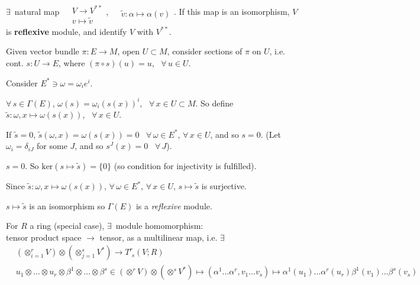 $\exists \,$ natural map $\begin{aligned} & \quad \\ 
	& V\to V^{**} \\ 
& v \mapsto \widetilde{v} \end{aligned}$,  $\begin{aligned} & \quad \\ 
	& \widetilde{v} : \alpha \mapsto \alpha(v) \end{aligned}$.  If this map is an isomorphism, $V$ is \textbf{reflexive} module, and identify $V$ with $V^{**}$.  

 Given vector bundle $\pi: E \to M$, open $U\subset M$, consider sections of $\pi$ on $U$, i.e. cont. $s:U\to E$, where $(\pi\circ s)(u)=u$, \, $\forall \, u \in U$.  

Consider $E^* \ni \omega =\omega_i e^i$.  

$\forall \, s\in \Gamma(E)$, $\omega(s) = \omega_i(s(x))^i$, \, $\forall \, x \in U\subset M$.  So define $\widetilde{s}: \omega,x\mapsto \omega(s(x))$, \, $\forall \, x \in U$.  

If $\widetilde{s} =0$, $\widetilde{s}(\omega,x) = \omega(s(x)) =0$ \quad \, $\forall \, \omega \in E^*$, $\forall \, x\in U$, and so $s=0$.  (Let $\omega_i = \delta_{iJ}$ for some $J$, and so $s^J(x) =0$ \quad \, $\forall \, J$).  

$s=0$.  So $\text{ker}(s\mapsto \widetilde{s}) = \lbrace 0 \rbrace$ (so condition for injectivity is fulfilled).  

Since $\widetilde{s}:\omega,x\mapsto \omega(s(x))$, $\forall \, \omega \in E^*$, $\forall \, x \in U$, $s\mapsto \widetilde{s}$ is surjective.  

$s\mapsto \widetilde{s}$ is an isomorphism so $\Gamma(E)$ is a \emph{reflexive} module.  


\begin{proposition}
For $R$ a ring (special case), $\exists \, $ module homomorphism:  \\

tensor product space $\to $ tensor, as a multilinear map, i.e. $\exists$ \,  
\begin{equation}
\begin{aligned}
&	\left( \otimes_{i=1}^r V \right) \otimes \left( \otimes_{j=1}^s V^* \right) \to T^r_{ \, \, s}(V;R)   \\
& u_1 \otimes \dots \otimes u_r \otimes \beta^1 \otimes \dots \otimes \beta^s \in \left( \otimes^r V \right) \otimes \left( \otimes^s V^* \right) \mapsto (\alpha^1 \dots \alpha^r, v_1 \dots v_s) \mapsto \alpha^1(u_1) \dots \alpha^r(u_r) \beta^1(v_1) \dots \beta^s(v_s)  
\end{aligned}
\end{equation}
\end{proposition}

